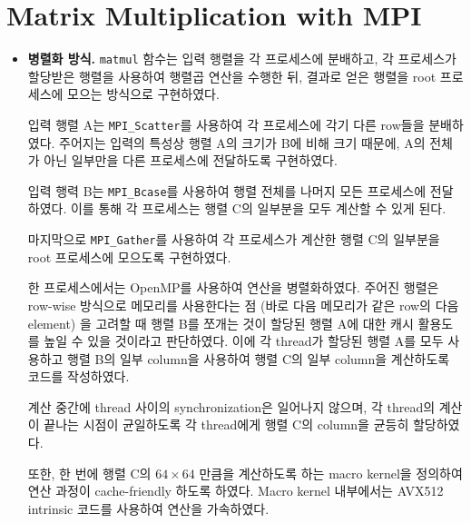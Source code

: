 \section{Matrix Multiplication with MPI}

\begin{itemize}

    \item {
        \textbf{병렬화 방식.}
        \texttt{matmul} 함수는 입력 행렬을 각 프로세스에 분배하고, 각 프로세스가 할당받은 행렬을 사용하여
        행렬곱 연산을 수행한 뒤, 결과로 얻은 행렬을 root 프로세스에 모으는 방식으로 구현하였다.

        입력 행렬 A는 \texttt{MPI\_Scatter}를 사용하여 각 프로세스에 각기 다른 row들을 분배하였다.
        주어지는 입력의 특성상 행렬 A의 크기가 B에 비해 크기 때문에, A의 전체가 아닌 일부만을
        다른 프로세스에 전달하도록 구현하였다.

        입력 행력 B는 \texttt{MPI\_Bcase}를 사용하여 행렬 전체를 나머지 모든 프로세스에 전달하였다.
        이를 통해 각 프로세스는 행렬 C의 일부분을 모두 계산할 수 있게 된다.

        마지막으로 \texttt{MPI\_Gather}를 사용하여 각 프로세스가 계산한 행렬 C의 일부분을 root 프로세스에
        모으도록 구현하였다.

        한 프로세스에서는 OpenMP를 사용하여 연산을 병렬화하였다.
        주어진 행렬은 row-wise 방식으로 메모리를 사용한다는 점 (바로 다음 메모리가 같은 row의 다음 element) 을
        고려할 때 행렬 B를 쪼개는 것이 할당된 행렬 A에 대한 캐시 활용도를 높일 수 있을 것이라고 판단하였다.
        이에 각 thread가 할당된 행렬 A를 모두 사용하고 행렬 B의 일부 column을 사용하여 행렬 C의 일부 column을
        계산하도록 코드를 작성하였다.

        계산 중간에 thread 사이의 synchronization은 일어나지 않으며, 각 thread의 계산이 끝나는
        시점이 균일하도록 각 thread에게 행렬 C의 column을 균등히 할당하였다.
        
        또한, 한 번에 행렬 C의 $64 \times 64$ 만큼을 계산하도록 하는 macro kernel을 정의하여
        연산 과정이 cache-friendly 하도록 하였다. Macro kernel 내부에서는 AVX512 intrinsic 코드를 사용하여
        연산을 가속하였다.
    }
    

\end{itemize}
